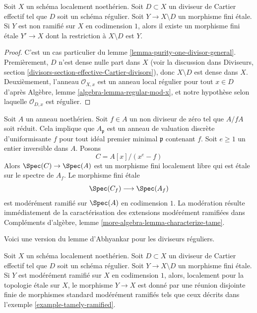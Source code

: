 \begin{lemma}
\label{lemma-purity-one-divisor}
Soit $X$ un schéma localement noethérien. Soit $D \subset X$
un diviseur de Cartier effectif tel que $D$ soit un schéma régulier.
Soit $Y \to X \setminus D$ un morphisme fini \'etale.
Si $Y$ est non ramifié sur $X$ en codimension $1$, alors
il existe un morphisme fini \'etale $Y' \to X$
dont la restriction à $X \setminus D$ est $Y$.
\end{lemma}

\begin{proof}
C'est un cas particulier du lemme \ref{lemma-purity-one-divisor-general}.
Premièrement, $D$ n'est dense nulle part dans $X$ (voir la discussion dans
Diviseurs, section \ref{divisors-section-effective-Cartier-divisors}),
donc $X \setminus D$ est dense dans $X$. Deuxièmement, l'anneau
$\mathcal{O}_{X, x}$ est un anneau local régulier pour tout $x \in D$ d'après
Algèbre, lemme \ref{algebra-lemma-regular-mod-x},
et notre hypothèse selon laquelle $\mathcal{O}_{D, x}$ est régulier.
\end{proof}

\begin{example}
\label{example-tamely-ramified}
Soit $A$ un anneau noethérien. Soit $f \in A$ un non diviseur de zéro
tel que $A/fA$ soit réduit. Cela implique que $A_\mathfrak p$
est un anneau de valuation discrète d'uniformisante $f$ pour tout
idéal premier minimal $\mathfrak p$ contenant $f$. Soit $e \geq 1$ un entier
inversible dans $A$. Posons
$$
C = A[x]/(x^e - f)
$$
Alors $\Spec(C) \to \Spec(A)$ est un morphisme fini localement libre
qui est \'etale sur le spectre de $A_f$. Le morphisme fini \'etale
$$
\Spec(C_f) \longrightarrow \Spec(A_f)
$$
est modérément ramifié sur $\Spec(A)$ en codimension $1$. La
modération résulte immédiatement de la caractérisation des extensions
modérément ramifiées dans
Compléments d'algèbre, lemme \ref{more-algebra-lemma-characterize-tame}.
\end{example}

\noindent
Voici une version du lemme d'Abhyankar pour les diviseurs réguliers.

\begin{lemma}
\label{lemma-abhyankar-one-divisor}
Soit $X$ un schéma localement noethérien. Soit $D \subset X$
un diviseur de Cartier effectif tel que $D$ soit un schéma régulier.
Soit $Y \to X \setminus D$ un morphisme fini \'etale.
Si $Y$ est modérément ramifié sur $X$ en codimension $1$, alors,
localement pour la topologie \'etale sur $X$, le morphisme $Y \to X$ est donné
par une réunion disjointe finie de morphismes standard modérément ramifiés
tels que ceux décrits dans l'exemple \ref{example-tamely-ramified}.
\end{lemma}

